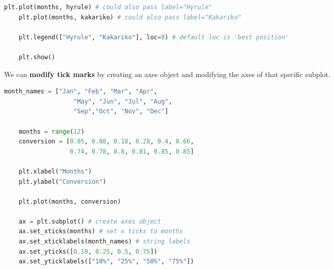 \documentclass[11pt, a4paper]{article}
\begin{document}
\begin{spacing}{1.1}
\begin{lstlisting}[language=Python]
	plt.plot(months, hyrule) # could also pass label="Hyrule"
	plt.plot(months, kakariko) # could also pass label="Kakariko"
	
	plt.legend(["Hyrule", "Kakariko"], loc=8) # default loc is 'best position'
	
	plt.show() \end{lstlisting}\vspace*{1mm}
	We can \textbf{modify tick marks} by creating an axes object and modifying the axes of that specific subplot.
	\begin{minipage}[c]{10cm}
	\begin{lstlisting}[language=Python]
	month_names = ["Jan", "Feb", "Mar", "Apr", 
	               "May", "Jun", "Jul", "Aug", 
	               "Sep","Oct", "Nov", "Dec"]
	
	months = range(12)
	conversion = [0.05, 0.08, 0.18, 0.28, 0.4, 0.66, 
	              0.74, 0.78, 0.8, 0.81, 0.85, 0.85]
	
	plt.xlabel("Months")
	plt.ylabel("Conversion")
	
	plt.plot(months, conversion)
	
	ax = plt.subplot() # create axes object
	ax.set_xticks(months) # set x ticks to months
	ax.set_xticklabels(month_names) # string labels
	ax.set_yticks([0.10, 0.25, 0.5, 0.75])
	ax.set_yticklabels(["10%", "25%", "50%", "75%"])
	

\end{lstlisting}
\end{minipage}
\end{spacing}
\end{document}
